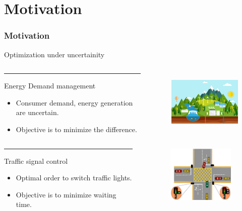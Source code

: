 

\section{Motivation}
\begin{frame}
\frametitle{\centering Motivation}
\begin{small}
\begin{block}{Optimization under uncertainity}
\begin{columns}[T]
\begin{column}{.48\textwidth}
\color{red}\rule{\linewidth}{4pt}
Energy Demand management
\begin{itemize}
\item Consumer demand, energy generation are uncertain.
\item Objective is to minimize the difference.
\end{itemize}
\end{column}
\begin{column}{.48\textwidth}
\begin{figure}
\includegraphics[width=5cm,height=3cm]{energymgmt}
\end{figure}
\end{column}
\end{columns}
\end{block}
\begin{block}{}
\begin{columns}[T]
\begin{column}{.48\textwidth}
\color{red}\rule{\linewidth}{4pt}
Traffic signal control
\begin{itemize}
\item Optimal order to switch traffic lights.
\item Objective is to minimize waiting time.
\end{itemize}
\end{column}
\begin{column}{.48\textwidth}
\begin{figure}
\includegraphics[width=4cm,height=2.7cm]{traffic}
\end{figure}
\end{column}
\end{columns}
\end{block}

\end{small}
\end{frame}




